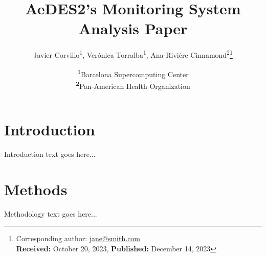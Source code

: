 \documentclass[
	a4paper, %
	8pt, %
	unnumberedsections, %
	twoside, %
]{LTJournalArticle}
\title{AeDES2's Monitoring System Analysis Paper} %
\author{%
	Javier Corvillo\textsuperscript{1}, Verónica Torralba\textsuperscript{1}, Ana-Riviére Cinnamond\textsuperscript{2}\thanks{Corresponding author: \href{mailto:jane@smith.com}{jane@smith.com}\\ \textbf{Received:} October 20, 2023, \textbf{Published:} December 14, 2023}
}
\date{\footnotesize\textsuperscript{\textbf{1}}Barcelona Supercomputing Center\\ \textsuperscript{\textbf{2}}Pan-American Health Organization}
\begin{document}
  \maketitle %


  \section{Introduction} \label{sec-intro}

  Introduction text goes here...


  \section{Methods} \label{sec-methods}

  Methodology text goes here...
\end{document}
